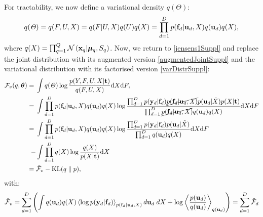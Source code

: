 For tractability, we now define a variational density $q(\Theta)$:
\begin{equation}
\label{varDistrSuppl}
q(\mathit{\Theta}) = q(F, U,X) = q(F | U, X) q(U) q(X) = \prod_{d=1}^D p(\mathbf{f}_d | \mathbf{u}_d, X )q(\mathbf{u}_d) q(X),
\end{equation}
%
%
where $q(X) = \prod_{q=1}^Q \mathcal{N} \left( \mathbf{x}_q | \boldsymbol \mu_q, S_q \right)$. 
%
Now, we return to \eqref{jensens1Suppl} and replace the joint distribution with its augmented version \eqref{augmentedJointSuppl} and the variational distribution with its factorised version \eqref{varDistrSuppl}:
\begin{align}
\mathcal{F}_v(q, \boldsymbol \theta) = {}& \int q(\mathit{\Theta}) \log 
		\frac{ p(Y,F, U,X | \mathbf{t})}
			 {q(F, U,X)}  \text{d}  X \text{d} F,
 	    \nonumber \\
= {}& \int \prod_{d=1}^D p(\mathbf{f}_d | \mathbf{u}_d, X )q(\mathbf{u}_d) q(X) 
	    \log  \frac{\prod_{d=1}^D p(\mathbf{y}_d | \mathbf{f}_d) \cancel{p(\mathbf{f}_d | \mathbf{u}_d, \mathit{X})}
						p(\mathbf{u}_d | \tilde{X})  p(X | \mathbf{t})}
 	      		   {\prod_{d=1}^D \cancel{p(\mathbf{f}_d | \mathbf{u}_d, X )}q(\mathbf{u}_d) q(X)}   \text{d}  X \text{d} F \nonumber \\
= {}& \int \prod_{d=1}^D p(\mathbf{f}_d | \mathbf{u}_d, X )q(\mathbf{u}_d) q(X) 
		\log  \frac{\prod_{d=1}^D p(\mathbf{y}_d | \mathbf{f}_d) p(\mathbf{u}_d | \tilde{X})}
				   {\prod_{d=1}^D q(\mathbf{u}_d) q(X)}   \text{d}  X \text{d} F \nonumber \\
- {}& \int \prod_{d=1}^D  q(X)   \log \frac{q(X)}{p(X | \mathbf{t})}   \text{d}  X \nonumber \\
= {}& \hat{\mathcal{F}}_v - \text{KL}(q \parallel p), \label{jensensSuppl}
\end{align}
%
with:
 \begin{equation}
\hat{\mathcal{F}}_v = 
\sum_{d=1}^D \left( 
    \int q(\mathbf{u}_d) q(X) \left\langle \log p(\mathbf{y}_d | \mathbf{f}_d) \right\rangle_{p(\mathbf{f}_d | \mathbf{u}_d, X)} d\mathbf{u}_d \; dX +
					   \log \left\langle \frac{p(\mathbf{u}_d)}{q(\mathbf{u}_d)} \right\rangle_{q(\mathbf{u}_d)} 
  \right) = \sum_{d=1}^D \hat{\mathcal{F}}_d
\end{equation} 

